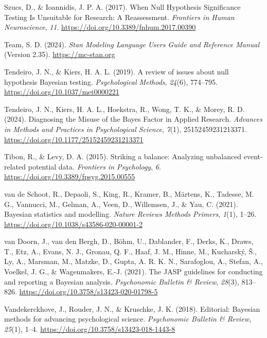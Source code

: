 \documentclass[
  doc,12pt,floatsintext]{apa7}
\newlength{\cslhangindent}
\newenvironment{CSLReferences}[2] %
 {\begin{list}{}{%
  \setlength{\itemindent}{0pt}
  \setlength{\leftmargin}{0pt}
  \setlength{\parsep}{0pt}
  \ifodd #1
   \setlength{\leftmargin}{\cslhangindent}
   \setlength{\itemindent}{-1\cslhangindent}
  \fi
  \setlength{\itemsep}{#2\baselineskip}}}
 {\end{list}}
\begin{document}
\begin{CSLReferences}{1}{0}
Szucs, D., \& Ioannidis, J. P. A. (2017). When {Null Hypothesis Significance Testing Is Unsuitable} for {Research}: {A Reassessment}. \emph{Frontiers in Human Neuroscience}, \emph{11}. \url{https://doi.org/10.3389/fnhum.2017.00390}

Team, S. D. (2024). \emph{Stan {Modeling Language Users Guide} and {Reference Manual}} (Version 2.35). \url{https://mc-stan.org}

Tendeiro, J. N., \& Kiers, H. A. L. (2019). A review of issues about null hypothesis {Bayesian} testing. \emph{Psychological Methods}, \emph{24}(6), 774--795. \url{https://doi.org/10.1037/met0000221}

Tendeiro, J. N., Kiers, H. A. L., Hoekstra, R., Wong, T. K., \& Morey, R. D. (2024). Diagnosing the {Misuse} of the {Bayes Factor} in {Applied Research}. \emph{Advances in Methods and Practices in Psychological Science}, \emph{7}(1), 25152459231213371. \url{https://doi.org/10.1177/25152459231213371}

Tibon, R., \& Levy, D. A. (2015). Striking a balance: Analyzing unbalanced event-related potential data. \emph{Frontiers in Psychology}, \emph{6}. \url{https://doi.org/10.3389/fpsyg.2015.00555}

van de Schoot, R., Depaoli, S., King, R., Kramer, B., Märtens, K., Tadesse, M. G., Vannucci, M., Gelman, A., Veen, D., Willemsen, J., \& Yau, C. (2021). Bayesian statistics and modelling. \emph{Nature Reviews Methods Primers}, \emph{1}(1), 1--26. \url{https://doi.org/10.1038/s43586-020-00001-2}

van Doorn, J., van den Bergh, D., Böhm, U., Dablander, F., Derks, K., Draws, T., Etz, A., Evans, N. J., Gronau, Q. F., Haaf, J. M., Hinne, M., Kucharský, Š., Ly, A., Marsman, M., Matzke, D., Gupta, A. R. K. N., Sarafoglou, A., Stefan, A., Voelkel, J. G., \& Wagenmakers, E.-J. (2021). The {JASP} guidelines for conducting and reporting a {Bayesian} analysis. \emph{Psychonomic Bulletin \& Review}, \emph{28}(3), 813--826. \url{https://doi.org/10.3758/s13423-020-01798-5}

Vandekerckhove, J., Rouder, J. N., \& Kruschke, J. K. (2018). Editorial: {Bayesian} methods for advancing psychological science. \emph{Psychonomic Bulletin \& Review}, \emph{25}(1), 1--4. \url{https://doi.org/10.3758/s13423-018-1443-8}


\end{CSLReferences}
\end{document}

